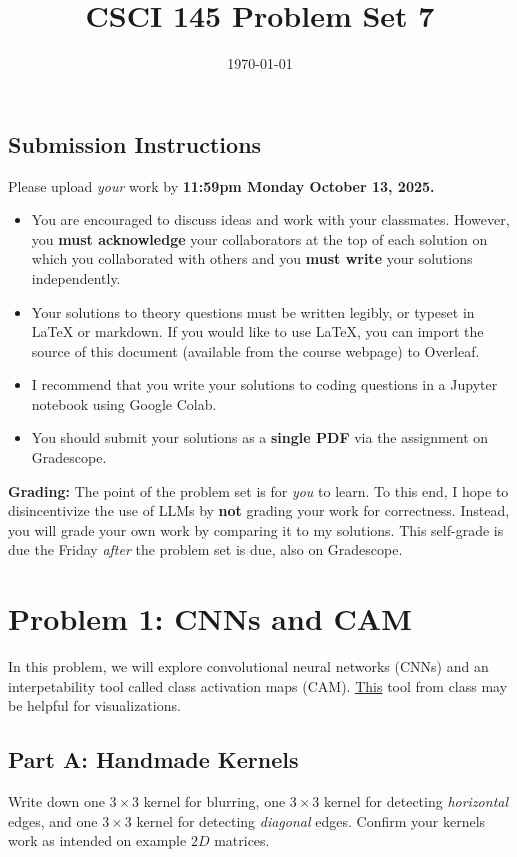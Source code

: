 \documentclass{article}
\title{CSCI 145 Problem Set 7}
\author{} %
\date{\today}
\begin{document}
\maketitle

\subsection*{Submission Instructions}

Please upload \textit{your} work by
\textbf{11:59pm Monday October 13, 2025.}
\begin{itemize}
\item You are encouraged to discuss ideas
and work with your classmates. However, you
\textbf{must acknowledge} your collaborators
at the top of each solution on which
you collaborated with others 
and you \textbf{must write} your solutions
independently.
\item Your solutions to theory questions must
be written legibly, or typeset in LaTeX or markdown.
If you would like to use LaTeX, you can import the source of this document (available from the course webpage) to Overleaf.
\item I recommend that you write your solutions to coding questions in a Jupyter notebook using Google Colab.
\item You should submit your solutions as a \textbf{single PDF} via the assignment on Gradescope.
\end{itemize}

\noindent
\textbf{Grading:} The point of the problem set is for \textit{you} to learn. To this end, I hope to disincentivize the use of LLMs by \textbf{not} grading your work for correctness. Instead, you will grade your own work by comparing it to my solutions. This self-grade is due the Friday \textit{after} the problem set is due, also on Gradescope.

\newpage
\section*{Problem 1: CNNs and CAM}

In this problem, we will explore convolutional neural networks (CNNs) and an interpetability tool called class activation maps (CAM).
\href{https://ezyang.github.io/convolution-visualizer/}{This} tool from class may be helpful for visualizations.

\subsection*{Part A: Handmade Kernels}
Write down one $3 \times 3$ kernel for blurring, one $3 \times 3$ kernel for detecting \textit{horizontal} edges, and one $3 \times 3$ kernel for detecting \textit{diagonal} edges.
Confirm your kernels work as intended on example $2D$ matrices.
\end{document}

